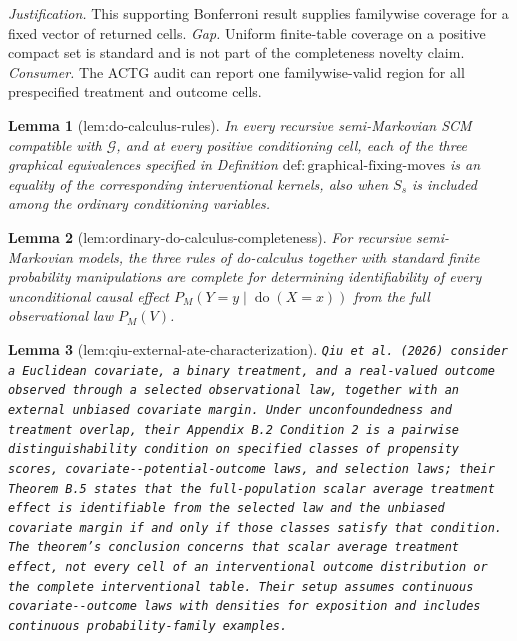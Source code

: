 \documentclass{article}
\newtheorem{lemma}{Lemma}
\begin{document}
\par\smallskip\noindent \textit{Justification.} This supporting Bonferroni result supplies familywise coverage for a fixed vector of returned cells. \textit{Gap.} Uniform finite-table coverage on a positive compact set is standard and is not part of the completeness novelty claim. \textit{Consumer.} The ACTG audit can report one familywise-valid region for all prespecified treatment and outcome cells.

\begin{lemma}[lem:do-calculus-rules]\label{lem:do-calculus-rules}
In every recursive semi-Markovian SCM compatible with \(\mathcal G\), and at every positive conditioning cell, each of the three graphical equivalences specified in Definition \(\mathrm{def{:}graphical\text{-}fixing\text{-}moves}\) is an equality of the corresponding interventional kernels, also when \(S_s\) is included among the ordinary conditioning variables.
\end{lemma}

\begin{lemma}[lem:ordinary-do-calculus-completeness]\label{lem:ordinary-do-calculus-completeness}
For recursive semi-Markovian models, the three rules of do-calculus together with standard finite probability manipulations are complete for determining identifiability of every unconditional causal effect \(P_M(Y=y\mid\operatorname{do}(X=x))\) from the full observational law \(P_M(V)\).
\end{lemma}

\begin{lemma}[lem:qiu-external-ate-characterization]\label{lem:qiu-external-ate-characterization}
\texttt{Qiu et al. (2026) consider a Euclidean covariate,\allowbreak{} a binary treatment,\allowbreak{} and a real-\allowbreak{}valued outcome observed through a selected observational law,\allowbreak{} together with an external unbiased covariate margin. Under unconfoundedness and treatment overlap,\allowbreak{} their Appendix B.2 Condition 2 is a pairwise distinguishability condition on specified classes of propensity scores,\allowbreak{} covariate-\allowbreak{}-\allowbreak{}potential-\allowbreak{}outcome laws,\allowbreak{} and selection laws;\allowbreak{} their Theorem B.5 states that the full-\allowbreak{}population scalar average treatment effect is identifiable from the selected law and the unbiased covariate margin if and only if those classes satisfy that condition. The theorem's conclusion concerns that scalar average treatment effect,\allowbreak{} not every cell of an interventional outcome distribution or the complete interventional table. Their setup assumes continuous covariate-\allowbreak{}-\allowbreak{}outcome laws with densities for exposition and includes continuous probability-\allowbreak{}family examples.}
\end{lemma}
\end{document}
